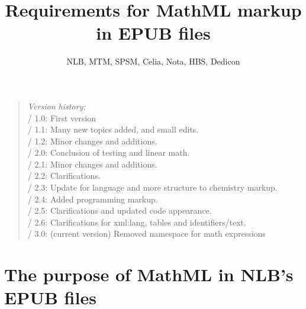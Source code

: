 \documentclass[english,a4paper,11pt]{article}
\title{Requirements for MathML markup\\ in EPUB files}
\author{NLB, MTM, SPSM, Celia, Nota, HBS, Dedicon}
\begin{document}
	\pagebottomtext
	\thispagestyle{empty}
	\raggedright
	
	\maketitle
	\thispagestyle{empty}
	\vfill
	\begin{quote} {
		\bigskip
		\emph{Version history:}\\
		\textbullet{} / 1.0: First version\\
		\textbullet{} / 1.1: Many new topics added, and small edits.\\
		\textbullet{} / 1.2: Minor changes and additions.\\
		\textbullet{} / 2.0: Conclusion of testing and linear math.\\
        \textbullet{} / 2.1: Minor changes and additions.\\
        \textbullet{} / 2.2: Clarifications.\\
        \textbullet{} / 2.3: Update for language and more structure to chemistry markup.\\
        \textbullet{} / 2.4: Added programming markup.\\
        \textbullet{} / 2.5: Clarifications and updated code appearance.\\
        \textbullet{} / 2.6: Clarifications for xml:lang, tables and identifiers/text.\\
        \textbullet{} / 3.0: (current version) Removed namespace for math expressions\\
        \bigskip
	}
	\end{quote}
	\vfill
	\pagebreak
	\tableofcontents
	\vfill
	\pagebreak

\section{The purpose of MathML in NLB's EPUB files}
\end{document}
